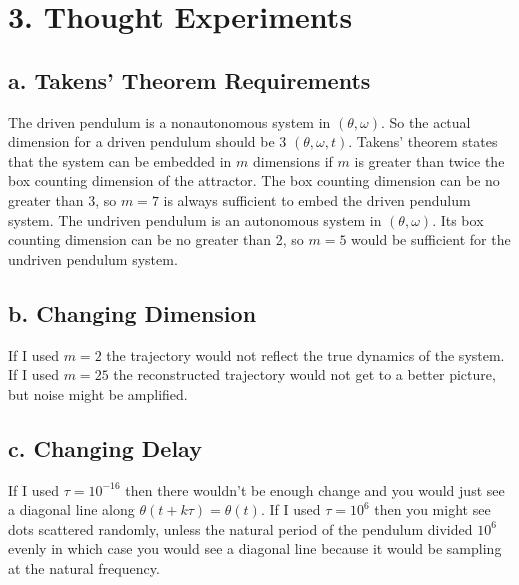 \documentclass[12pt, letterpaper]{article}
\begin{document}
\section*{3. Thought Experiments}
\subsection*{a. Takens' Theorem Requirements}

The driven pendulum is a nonautonomous system in $(\theta, \omega)$. So the 
actual dimension for a driven pendulum should be 3 $(\theta, \omega, t)$. Takens'
theorem states that the system can be embedded in $m$ dimensions if $m$ is 
greater than twice the box counting dimension of the attractor. The box counting
dimension can be no greater than 3, so $m=7$ is always sufficient to embed the
driven pendulum system. The undriven pendulum is an autonomous system in 
$(\theta, \omega)$. Its box counting dimension can be no greater than 2, so
$m=5$ would be sufficient for the undriven pendulum system.

\subsection*{b. Changing Dimension}

If I used $m=2$ the trajectory would not reflect the true dynamics of the 
system. If I used $m=25$ the reconstructed trajectory would not get to a better
picture, but noise might be amplified.

\subsection*{c. Changing Delay}

If I used $\tau=10^{-16}$ then there wouldn't be enough change and you would 
just see a diagonal line along $\theta(t+k\tau) = \theta(t)$. If I used 
$\tau=10^6$ then you might see dots scattered randomly, unless the natural 
period of the pendulum divided $10^6$ evenly in which case you would see a 
diagonal line because it would be sampling at the natural frequency.
\end{document}
